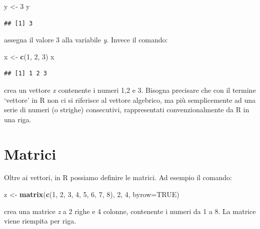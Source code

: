 \documentclass[a4paper,12pt,oneside]{book}
\newenvironment{Shaded}{\begin{snugshade}}{\end{snugshade}}
\newcommand{\KeywordTok}[1]{\textcolor[rgb]{0.13,0.29,0.53}{\textbf{#1}}}
\newcommand{\DataTypeTok}[1]{\textcolor[rgb]{0.13,0.29,0.53}{#1}}
\newcommand{\DecValTok}[1]{\textcolor[rgb]{0.00,0.00,0.81}{#1}}
\newcommand{\StringTok}[1]{\textcolor[rgb]{0.31,0.60,0.02}{#1}}
\newcommand{\OtherTok}[1]{\textcolor[rgb]{0.56,0.35,0.01}{#1}}
\newcommand{\NormalTok}[1]{#1}
\begin{document}
\begin{Shaded}
\begin{Highlighting}[]
\NormalTok{y  <-}\StringTok{  }\DecValTok{3}
\NormalTok{y}
\end{Highlighting}
\end{Shaded}

\begin{verbatim}
## [1] 3
\end{verbatim}

assegna il valore 3 alla variabile \emph{y}. Invece il comando:

\begin{Shaded}
\begin{Highlighting}[]
\NormalTok{x  <-}\StringTok{  }\KeywordTok{c}\NormalTok{(}\DecValTok{1}\NormalTok{, }\DecValTok{2}\NormalTok{, }\DecValTok{3}\NormalTok{)}
\NormalTok{x}
\end{Highlighting}
\end{Shaded}

\begin{verbatim}
## [1] 1 2 3
\end{verbatim}

crea un vettore \emph{x} contenente i numeri 1,2 e 3. Bisogna precisare
che con il termine `vettore' in R non ci si riferisce al vettore
algebrico, ma più semplicemente ad una serie di numeri (o strighe)
consecutivi, rappresentati convenzionalmente da R in una riga.

\section{Matrici}\label{matrici}

Oltre ai vettori, in R possiamo definire le matrici. Ad esempio il
comando:

\begin{Shaded}
\begin{Highlighting}[]
\NormalTok{z  <-}\StringTok{  }\KeywordTok{matrix}\NormalTok{(}\KeywordTok{c}\NormalTok{(}\DecValTok{1}\NormalTok{, }\DecValTok{2}\NormalTok{, }\DecValTok{3}\NormalTok{, }\DecValTok{4}\NormalTok{, }\DecValTok{5}\NormalTok{, }\DecValTok{6}\NormalTok{, }\DecValTok{7}\NormalTok{, }\DecValTok{8}\NormalTok{), }\DecValTok{2}\NormalTok{, }\DecValTok{4}\NormalTok{, }\DataTypeTok{byrow=}\OtherTok{TRUE}\NormalTok{)}
\end{Highlighting}
\end{Shaded}

crea una matrice \emph{z} a 2 righe e 4 colonne, contenente i numeri da
1 a 8. La matrice viene riempita per riga.
\end{document}

